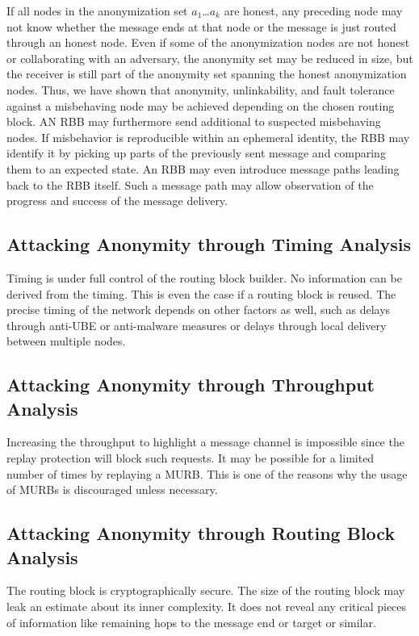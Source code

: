 If all nodes in the anonymization set $a_1$\ldots$a_k$ are honest, any preceding node may not know whether the message ends at that node or the message is just routed through an honest node. Even if some of the anonymization nodes are not honest or collaborating with an adversary, the anonymity set may be reduced in size, but the receiver is still part of the anonymity set spanning the honest anonymization nodes. Thus, we have shown that anonymity, unlinkability, and fault tolerance against a misbehaving node may be achieved depending on the chosen routing block. AN RBB may furthermore send additional \VortexMessages to suspected misbehaving nodes. If misbehavior is reproducible within an ephemeral identity, the RBB may identify it by picking up parts of the previously sent message and comparing them to an expected state. An RBB may even introduce message paths leading back to the RBB itself. Such a message path may allow observation of the progress and success of the message delivery.

\subsection{Attacking Anonymity through Timing Analysis}
Timing is under full control of the routing block builder. No information can be derived from the timing. This is even the case if a routing block is reused. The precise timing of the network depends on other factors as well, such as delays through anti-UBE or anti-malware measures or delays through local delivery between multiple nodes.

\subsection{Attacking Anonymity through Throughput Analysis}
Increasing the throughput to highlight a message channel is impossible since the replay protection will block such requests. It may be possible for a limited number of times by replaying a MURB. This is one of the reasons why the usage of MURBs is discouraged unless necessary.

\subsection{Attacking Anonymity through Routing Block Analysis}
The routing block is cryptographically secure. The size of the routing block may leak an estimate about its inner complexity. It does not reveal any critical pieces of information like remaining hops to the message end or target or similar.

